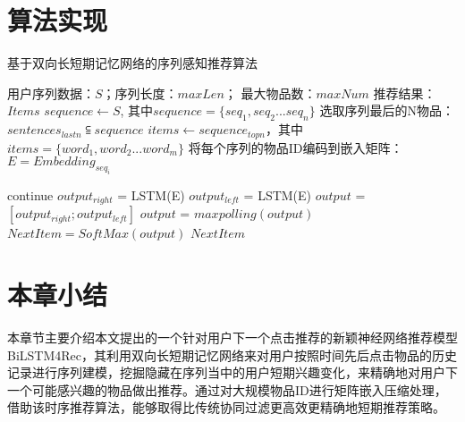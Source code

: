 \section{算法实现}
\begin{algorithm}[H]%
	\caption{基于双向长短期记忆网络的序列感知推荐算法}
	\label{alg:bi-lstm}
		\begin{algorithmic}[1]
			\REQUIRE 用户序列数据：$S$；序列长度：$maxLen$； 最大物品数：$maxNum$
			\ENSURE 推荐结果：$Items$
			\STATE $sequence \leftarrow S$, 其中$sequence=\{seq_{1}, seq_{2}...seq_{n}\}$
				\STATE 选取序列最后的N物品：$sentences_{lastn} \subseteqq sequence$
			  	\STATE $items \leftarrow sequence_{topn}$，其中 $items=\{word_{1}, word_{2}...word_{m}\}$
			    \STATE 将每个序列的物品ID编码到嵌入矩阵：$E = Embedding_{seq_{i}}$
			  \ENDFOR
			  
			\ELSE
				\STATE continue
			\ENDIF
				\STATE $output_{right}$ = LSTM(E)
				\ENDFOR
				\STATE $output_{left}$ = LSTM(E)
				\ENDFOR
			\STATE $output$ = $[output_{right}; output_{left}]$
			\STATE $output$ = $maxpolling(output)$
			\STATE $NextItem = SoftMax(output) $
			\RETURN $NextItem$
		\end{algorithmic}
\end{algorithm}

\section{本章小结}

本章节主要介绍本文提出的一个针对用户下一个点击推荐的新颖神经网络推荐模型BiLSTM4Rec，其利用双向长短期记忆网络来对用户按照时间先后点击物品的历史记录进行序列建模，挖掘隐藏在序列当中的用户短期兴趣变化，来精确地对用户下一个可能感兴趣的物品做出推荐。通过对大规模物品ID进行矩阵嵌入压缩处理，借助该时序推荐算法，能够取得比传统协同过滤更高效更精确地短期推荐策略。

